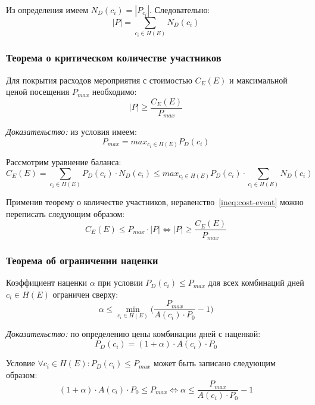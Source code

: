 Из определения имеем $N_D(c_i) = |P_{c_i}|$. Следовательно:
\begin{equation}
	|P| = \sum_{c_i \in H(E)}{N_D(c_i)}
\end{equation}

\subsubsection{Теорема о критическом количестве участников}

Для покрытия расходов мероприятия с стоимостью $C_E(E)$ и максимальной ценой посещения $P_{max}$ необходимо:
\begin{equation}
	|P| \ge \frac{C_E(E)}{P_{max}}
\end{equation}

\textit{Доказательство:} из условия имеем:
\begin{equation}
	P_{max} = max_{c_i \in H(E)}{P_D(c_i)}
\end{equation}

Рассмотрим уравнение баланса:
\begin{equation}
	C_E(E) = \sum_{c_i \in H(E)}{P_D(c_i) \cdot N_D(c_i)} \le max_{c_i \in H(E)}{P_D(c_i)} \cdot \sum_{c_i \in H(E)}{N_D(c_i)}
	\label{ineq:cost-event}
\end{equation}

Применив теорему о количестве участников, неравенство~\ref{ineq:cost-event} можно переписать следующим образом:
\begin{equation}
	C_E(E) \le P_{max} \cdot |P| \Leftrightarrow |P| \ge \frac{C_E(E)}{P_{max}}
\end{equation}

\subsubsection{Теорема об ограничении наценки}

Коэффициент наценки $\alpha$ при условии $P_D(c_i) \le P_{max}$ для всех комбинаций дней $c_i \in H(E)$ ограничен сверху:
\begin{equation}
	\alpha \le \min_{c_i \in H(E)}{\Big(\frac{P_{max}}{A(c_i) \cdot P_0} - 1\Big)}
\end{equation}

\textit{Доказательство:} по определению цены комбинации дней с наценкой:
\begin{equation}
	P_D(c_i) = (1 + \alpha) \cdot A(c_i) \cdot P_0
\end{equation}

Условие $\forall c_i \in H(E): P_D(c_i) \le P_{max}$ может быть записано следующим образом:
\begin{equation}
	(1 + \alpha) \cdot A(c_i) \cdot P_0 \le P_{max} \Leftrightarrow \alpha \le \frac{P_{max}}{A(c_i) \cdot P_0} - 1
\end{equation}

